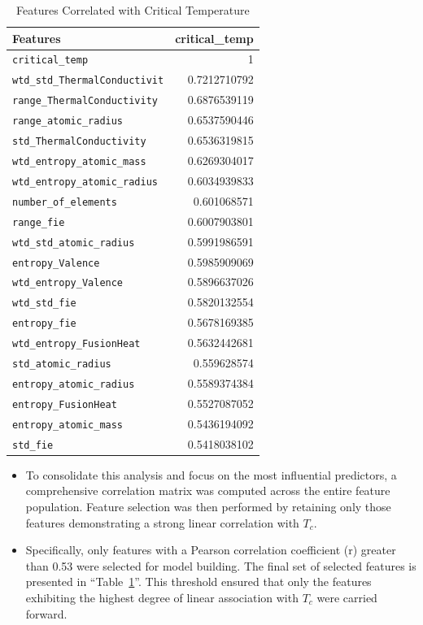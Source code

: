 \documentclass[conference]{IEEEtran}
\begin{document}
\begin{table}[h]
	\centering
	\caption{Features Correlated with Critical Temperature}
	\label{WhlCorr}
	\begin{tabular}{|l|r|}
		\hline
		\textbf{Features} & \textbf{critical\_temp} \\
		\hline
		\texttt{critical\_temp} & 1 \\
		\texttt{wtd\_std\_ThermalConductivit} & 0.7212710792 \\
		\texttt{range\_ThermalConductivity} & 0.6876539119 \\
		\texttt{range\_atomic\_radius} & 0.6537590446 \\
		\texttt{std\_ThermalConductivity} & 0.6536319815 \\
		\texttt{wtd\_entropy\_atomic\_mass} & 0.6269304017 \\
		\texttt{wtd\_entropy\_atomic\_radius} & 0.6034939833 \\
		\texttt{number\_of\_elements} & 0.601068571 \\
		\texttt{range\_fie} & 0.6007903801 \\
		\texttt{wtd\_std\_atomic\_radius} & 0.5991986591 \\
		\texttt{entropy\_Valence} & 0.5985909069 \\
		\texttt{wtd\_entropy\_Valence} & 0.5896637026 \\
		\texttt{wtd\_std\_fie} & 0.5820132554 \\
		\texttt{entropy\_fie} & 0.5678169385 \\
		\texttt{wtd\_entropy\_FusionHeat} & 0.5632442681 \\
		\texttt{std\_atomic\_radius} & 0.559628574 \\
		\texttt{entropy\_atomic\_radius} & 0.5589374384 \\
		\texttt{entropy\_FusionHeat} & 0.5527087052 \\
		\texttt{entropy\_atomic\_mass} & 0.5436194092 \\
		\texttt{std\_fie} & 0.5418038102 \\
		\hline
	\end{tabular}
\end{table}
\begin{itemize}
	\item To consolidate this analysis and focus on the most influential predictors, a comprehensive correlation matrix was computed across the entire feature population. Feature selection was then performed by retaining only those features demonstrating a strong linear correlation with $T_c$.
	\item Specifically, only features with a Pearson correlation coefficient (r) greater than 0.53 were selected for model building. The final set of selected features is presented in ``Table~\ref{WhlCorr}''. This threshold ensured that only the features exhibiting the highest degree of linear association with $T_c$ were carried forward.\\
\end{itemize}
\end{document}
